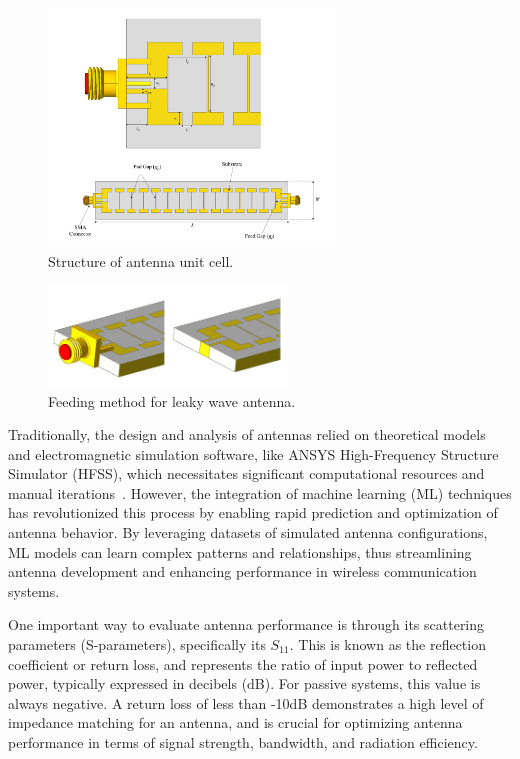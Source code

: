 \documentclass[conference]{IEEEtran}
\begin{document}
\begin{figure}[h]
\begin{center}
\noindent
  \includegraphics[width=3in]{LWA.png}
  \caption{Structure of antenna unit cell.}\label{LWA}
\end{center}
\end{figure}

\begin{figure}[h]
\begin{center}
\noindent
  \includegraphics[width=2.5in]{Feeding Method.jpg}
  \caption{Feeding method for leaky wave antenna.}\label{LWA_feed}
\end{center}
\end{figure}

Traditionally, the design and analysis of antennas relied on theoretical models and electromagnetic simulation software, like ANSYS High-Frequency Structure Simulator (HFSS), which necessitates significant computational resources and manual iterations~\cite{john_antenna_2009,ranjan_design_2023,liu_efficient_2014}. However, the integration of machine learning (ML) techniques has revolutionized this process by enabling rapid prediction and optimization of antenna behavior. By leveraging datasets of simulated antenna configurations, ML models can learn complex patterns and relationships, thus streamlining antenna development and enhancing performance in wireless communication systems.

One important way to evaluate antenna performance is through its scattering parameters (S-parameters), specifically its $S_{11}$. This is known as the reflection coefficient or return loss, and represents the ratio of input power to reflected power, typically expressed in decibels (dB). For passive systems, this value is always negative. A return loss of less than -10dB demonstrates a high level of impedance matching for an antenna, and is crucial for optimizing antenna performance in terms of signal strength, bandwidth, and radiation efficiency. 
\end{document}
